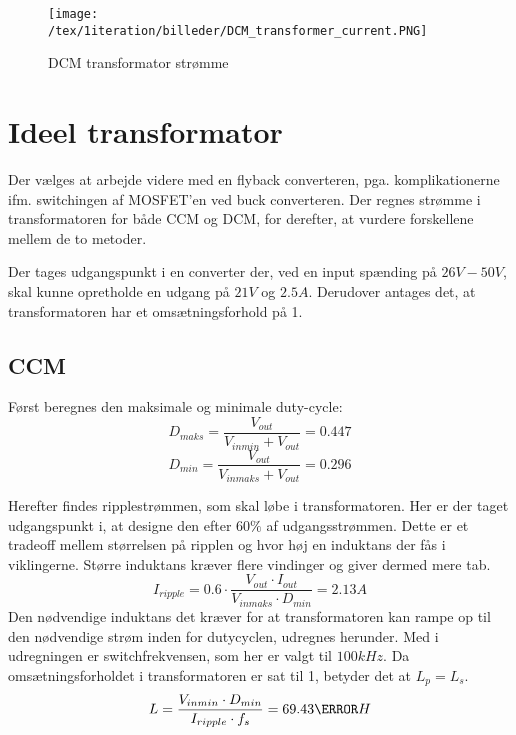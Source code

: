 \begin{figure}[H]
	\center
	\texttt{[image: /tex/1iteration/billeder/DCM\_transformer\_current.PNG]}
	\caption{DCM transformator strømme
		\cite{SMPS-topologies}}
	\label{fig:DCM_transformer_current}
\end{figure}


\section{Ideel transformator}
Der vælges at arbejde videre med en flyback converteren, pga. komplikationerne ifm. switchingen af MOSFET'en ved buck converteren.
Der regnes strømme i transformatoren for både CCM og DCM, for derefter, at vurdere forskellene mellem de to metoder.

\noindent Der tages udgangspunkt i en converter der, ved en input spænding på $26V-50V$, skal kunne opretholde en udgang på $21V$ og $2.5A$. Derudover antages det, at transformatoren har et omsætningsforhold på 1.

\subsection{CCM} \label{maksimum_duty_cycle}
Først beregnes den maksimale og minimale duty-cycle:
\begin{equation} \label{D_maks_CCM}
D_{maks} = \frac{V_{out}}{V_{inmin} + V_{out}} = 0.447
\end{equation}
\begin{equation} \label{D_min_CCM}
D_{min} = \frac{V_{out}}{V_{inmaks} + V_{out}} = 0.296
\end{equation}

Herefter findes ripplestrømmen, som skal løbe i transformatoren. Her er der taget udgangspunkt i, at designe den efter $60\percent$ af udgangsstrømmen\cite{flyback-formler}. Dette er et tradeoff mellem størrelsen på ripplen og hvor høj en induktans der fås i viklingerne. Større induktans kræver flere vindinger og giver dermed mere tab.
\begin{equation}
I_{ripple} = 0.6 \cdot \frac{V_{out} \cdot I_{out}}{V_{inmaks} \cdot   D_{min}} = 2.13A
\end{equation}
Den nødvendige induktans det kræver for at transformatoren kan rampe op til den nødvendige strøm inden for dutycyclen, udregnes herunder\cite{flyback-formler}. Med i udregningen er switchfrekvensen, som her er valgt til $100kHz$. Da omsætningsforholdet i transformatoren er sat til 1, betyder det at $L_p = L_s$.
\begin{equation}
L = \frac{V_{inmin} \cdot D_{min}}{I_{ripple} \cdot f_s} = 69.43\micro H
\end{equation}

